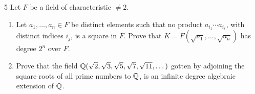\documentclass[12pt]{article}
\begin{document}
\newpage

\begin{problem}{5}
    Let $F$ be a field of characteristic $\neq 2$.  
    \begin{enumerate}\renewcommand{\itemsep}{3mm}
    \item Let $a_1,\dotsc,a_n \in F$ be distinct elements such that no product $a_{i_1}\dotsm a_{i_r}$, with distinct indices $i_j$, is a square in $F$.  Prove that $K = F(\sqrt{a_1},\dotsc,\sqrt{a_n})$ has degree $2^n$ over $F$.

    \item Prove that the field $\mathbb Q(\sqrt{2}, \sqrt{3}, \sqrt{5}, \sqrt{7}, \sqrt{11}, \dotsc)$ gotten by adjoining the square roots of all prime numbers to $\mathbb Q$, is an infinite degree algebraic extension of $\mathbb Q$. 
    \end{enumerate}
\end{problem}
\end{document}
